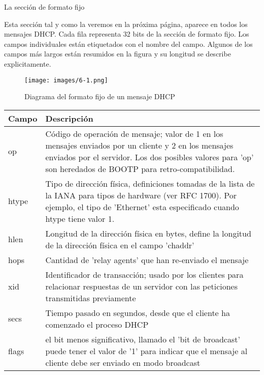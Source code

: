 \begin{frame}{La sección de formato fijo}

    Esta sección tal y como la veremos en la próxima página, aparece en todos
    los mensajes DHCP. Cada fila representa 32 bits de la sección de formato
    fijo. Los campos individuales están etiquetados con el nombre del campo.
    Algunos de los campos más largos están resumidos en la figura y su longitud
    se describe explicitamente.\\[0.2cm]

    \framebreak
    
    \begin{figure}
    \begin{center}

    \texttt{[image: images/6-1.png]}
    \caption{Diagrama del formato fijo de un mensaje DHCP}
    \label{FIXED-1}

    \end{center}
    \end{figure}


\framebreak

\begin{tabular}{ l p{} }
\hline
\textbf{Campo} & \textbf{Descripción} \\ 
\hline
op & Código de operación de mensaje; valor de 1 en los mensajes enviados por un
cliente y 2 en los mensajes enviados por el servidor. Los dos posibles valores
para 'op' son heredados de BOOTP para retro-compatibilidad. \\
\hline
htype & Tipo de dirección física, definiciones tomadas de la lista de la IANA
para tipos de hardware (ver RFC 1700). Por ejemplo, el tipo de 'Ethernet' esta
especificado cuando htype tiene valor 1. \\
\hline
hlen & Longitud de la dirección física en bytes, define la longitud de la
dirección física en el campo 'chaddr' \\
\hline
hops & Cantidad de 'relay agents' que han re-enviado el mensaje \\
\hline
xid & Identificador de transacción; usado por los clientes para relacionar
respuestas de un servidor con las peticiones transmitidas previamente \\
\hline
secs & Tiempo pasado en segundos, desde que el cliente ha comenzado el proceso
DHCP \\ 
\hline
flags & el bit menos significativo, llamado el 'bit de broadcast' puede tener
el valor de '1' para indicar que el mensaje al cliente debe ser enviado en modo
broadcast \\
\end{tabular}


\end{frame}
